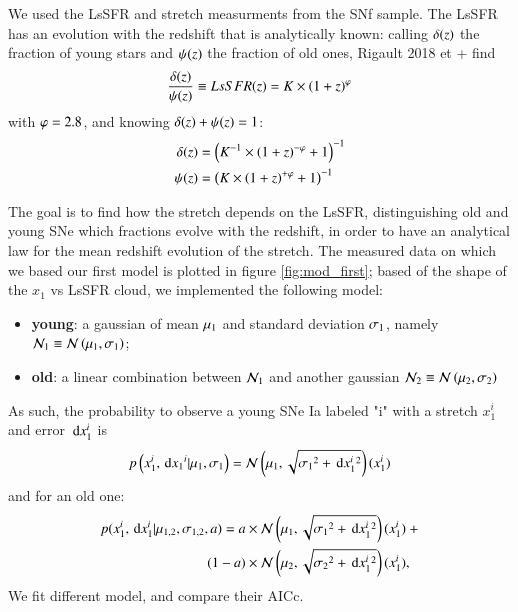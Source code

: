 \documentclass{aa}
\begin{document}
We used the LsSFR and stretch measurments from the SNf sample. The LsSFR has an
evolution with the redshift that is analytically known: calling $\delta(z)$ the
fraction of young stars and $\psi(z)$ the fraction of old ones, Rigault 2018 et +
find
\begin{equation}
    \frac{\delta(z)}{\psi(z)} \equiv LsSFR(z) = K\times \left(1+z\right)^\varphi
\end{equation}
with $\varphi = 2.8$, and knowing $\delta(z) + \psi(z) = 1$:
\begin{align}
    \delta(z) & = \left(K^{-1}\times \left(1+z\right)^{-\varphi} +1\right)^{-1}\\
    \psi(z) & = \left(K\times \left(1+z\right)^{+\varphi} + 1\right)^{-1}
\end{align}

The goal is to find how the stretch depends on the LsSFR, distinguishing old and
young SNe which fractions evolve with the redshift, in order to have an
analytical law for the mean redshift evolution of the stretch. The measured data
on which we based our first model is plotted in figure \ref{fig:mod_first};
based of the shape of the $x_1$ vs LsSFR cloud, we implemented the following
model:
\begin{itemize}
    \item \textbf{young}: a gaussian of mean $\mu_1$ and standard deviation
        $\sigma_1$, namely $\mathcal{N}_1 \equiv \mathcal{N} \left(\mu_1,\sigma_1\right)$;
    \item \textbf{old}: a linear combination between $\mathcal{N}_1$ and another
        gaussian $\mathcal{N}_2 \equiv \mathcal{N} \left(\mu_2,\sigma_2\right)$
\end{itemize}
As such, the probability to observe a young SNe Ia labeled "i" with a stretch
$x_1^i$ and error $\,\mathrm{d} x_1^i$ is
\begin{equation}
    p \left(x_1^i, \,\mathrm{d} x_1{}^i|\mu_1,\sigma_1\right) = \mathcal{N} \left(\mu_1, \sqrt{\sigma_1{}^2 + \,\mathrm{d}
    x_1^i{}^2}\right)(x_1^i)
\end{equation}
and for an old one:
\begin{align}
    p(x_1^i, \,\mathrm{d} x_1^i | \mu_{1,2}, \sigma_{1,2}, a) = a & \times \mathcal{N} \left(\mu_1,
    \sqrt{\sigma_1{}^2 + \,\mathrm{d} x_1^i{}^{2}}\right) (x_1^i) \ + \\ (1-a) & \times \mathcal{N}
    \left(\mu_2, \sqrt{ \sigma_2{}^2 + \,\mathrm{d} x_1^i{}^{2}}\right) (x_1^i), \nonumber 
\end{align}
We fit different model, and compare their AICc.
\end{document}
